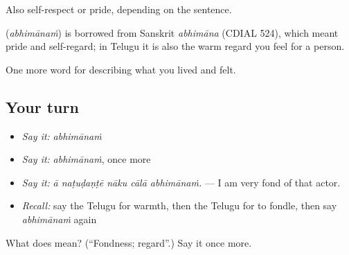 Also self-respect or pride, depending on the sentence.

\begin{cousinweb}
\textbf{} (\emph{abhimānaṁ}) is borrowed from Sanskrit \emph{abhimāna} (CDIAL 524), which meant pride and self-regard; in Telugu it is also the warm regard you feel for a person.
\end{cousinweb}

\begin{grammarlens}[title={What you've built}]
One more word for describing what you lived and felt.
\end{grammarlens}

\subsection*{Your turn}
\begin{itemize}
\raggedright
  \item \emph{Say it:} \emph{abhimānaṁ}
  \item \emph{Say it:} \emph{abhimānaṁ}, once more
  \item \emph{Say it:} \emph{ā naṭuḍaṇṭē nāku cālā abhimānaṁ.} — I am very fond of that actor.
  \item \emph{Recall:} say the Telugu for warmth, then the Telugu for to fondle, then say \emph{abhimānaṁ} again
\end{itemize}

\begin{tcolorbox}[breakable,colback=teal!4,colframe=teal!35!black,title={Before you move on}]
What does  mean? (\textquotedblleft{}Fondness; regard\textquotedblright{}.) Say it once more.
\end{tcolorbox}
